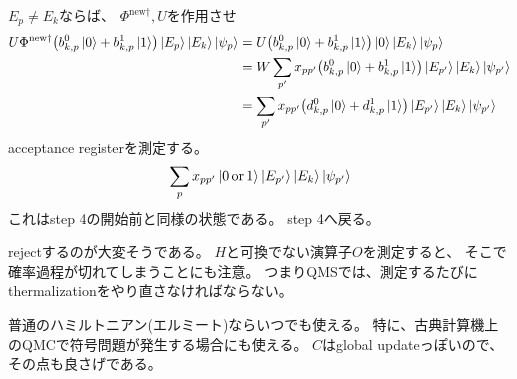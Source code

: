 \documentclass[]{ltjsarticle}
\begin{document}
$E_p \neq E_k$ならば、
$\Phi^{\text{new}\dagger}, U$を作用させ
\begin{align}
    U\Phi^{\text{new}\dagger}
    \qty(
        b_{k,p}^0\ket{0}
        +
        b_{k,p}^1\ket{1}
    )
    \ket{E_p}
    \ket{E_k}
    \ket{\psi_{p}}
    &=
    U
    \qty(
        b_{k,p}^0\ket{0}
        +
        b_{k,p}^1\ket{1}
    )
    \ket{0}
    \ket{E_k}
    \ket{\psi_{p}} \\
    &=
    W
    \sum_{p'}
    x_{pp'}
    \qty(
        b_{k,p}^0\ket{0}
        +
        b_{k,p}^1\ket{1}
    )
    \ket{E_{p'}}
    \ket{E_k}
    \ket{\psi_{p'}} \\
    &=
    \sum_{p'}
    x_{pp'}
    \qty(
        d_{k,p}^0\ket{0}
        +
        d_{k,p}^1\ket{1}
    )
    \ket{E_{p'}}
    \ket{E_k}
    \ket{\psi_{p'}}
\end{align}
acceptance registerを測定する。
\begin{align}
    \sum_p
    x_{pp'}
    \ket{0 \,\text{or}\, 1}
    \ket{E_{p'}}
    \ket{E_k}
    \ket{\psi_{p'}}
\end{align}
これはstep 4の開始前と同様の状態である。
step 4へ戻る。

rejectするのが大変そうである。
$H$と可換でない演算子$O$を測定すると、
そこで確率過程が切れてしまうことにも注意。
つまりQMSでは、測定するたびにthermalizationをやり直さなければならない。

普通のハミルトニアン(エルミート)ならいつでも使える。
特に、古典計算機上のQMCで符号問題が発生する場合にも使える。
$C$はglobal updateっぽいので、その点も良さげである。


%
%
\end{document}
